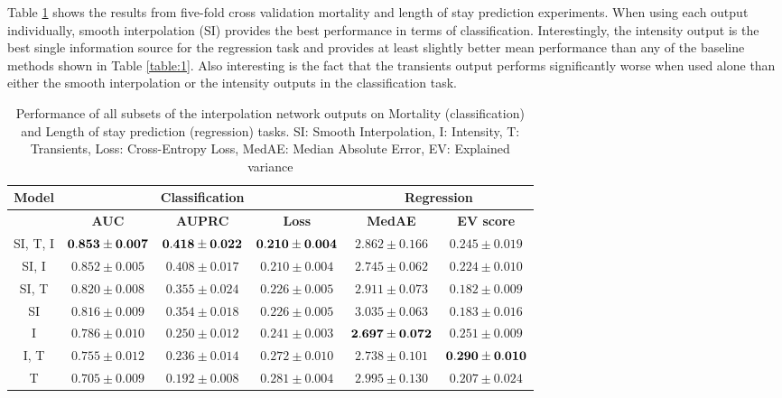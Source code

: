 \documentclass{article} \usepackage{iclr2019_conference,times}
\begin{document}
Table \ref{table:analysis} shows the results from five-fold cross validation mortality and length of stay prediction experiments. When using each output individually, smooth 
interpolation (SI) provides the best performance in terms of classification. Interestingly,
the intensity output is the best single information source for the regression task
and provides at least slightly better mean performance than any of the baseline methods 
shown in Table \ref{table:1}. Also interesting is the fact that the transients output 
performs significantly worse when used alone than either the smooth interpolation 
or the intensity outputs in the classification task.  

\begin{table}[h]
\caption{Performance of all subsets of the interpolation network outputs
on Mortality (classification) and Length of stay prediction (regression) tasks. SI: Smooth Interpolation, I: Intensity, T: Transients, Loss: Cross-Entropy Loss, MedAE: Median Absolute Error, EV: Explained variance }
\footnotesize
\begin{center}

\begin{tabular}{ c c c c c c} 
 \toprule
 {\bf Model}&  \multicolumn{3}{c}{\bf Classification} &  \multicolumn{2}{c}{\bf Regression}\\
 \midrule
 {} & {\bf AUC} & {\bf AUPRC} & {\bf Loss} & {\bf MedAE} & {\bf EV score}\\
 \midrule
 SI, T, I & ${\bf 0.853 \pm 0.007}$ & ${\bf 0.418\pm0.022}$& ${\bf 0.210 \pm 0.004}$  & $2.862\pm0.166$ & $0.245\pm0.019$ \\
 SI, I & $0.852 \pm 0.005$ & $0.408\pm0.017$ & $0.210 \pm 0.004$  & $2.745\pm0.062$ & $0.224\pm0.010$ \\
  SI, T & $0.820 \pm 0.008$ & $0.355\pm0.024$& $0.226 \pm 0.005$ & $2.911\pm0.073$ & $0.182\pm0.009$\\
 SI & $0.816 \pm 0.009$ &$0.354\pm0.018$& $0.226 \pm 0.005$ & $3.035\pm0.063$ &	$0.183\pm0.016$\\	 
I & $0.786\pm 0.010$ & $0.250\pm0.012$& $0.241 \pm 0.003$	 &  ${\bf 2.697\pm0.072}$ & 	$0.251\pm0.009$\\	
 I, T & $0.755 \pm 0.012$ & $0.236\pm0.014$&	$0.272 \pm 0.010$ & $2.738\pm0.101$ & ${\bf 0.290\pm0.010}$\\	
 T & $0.705 \pm 0.009$ & $0.192\pm0.008$&	$0.281 \pm 0.004$ & $2.995\pm0.130$ &	$0.207\pm0.024$ \\
  \bottomrule
 \end{tabular}
\end{center}

\label{table:analysis}
\end{table}
\end{document}
